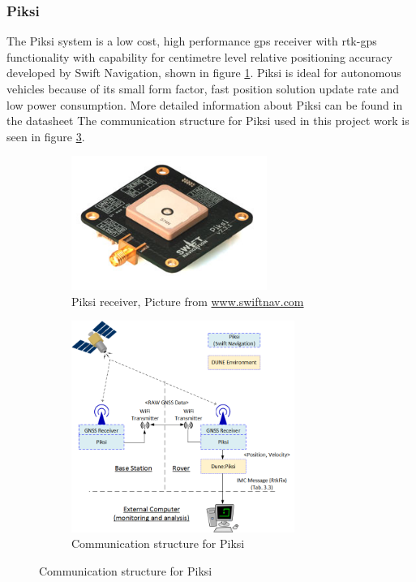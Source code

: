 \subsubsection{Piksi}\label{ss:Piksi}
The Piksi system is a low cost, high performance \gls{gps} receiver with \gls{rtk-gps} functionality with capability for centimetre level relative positioning accuracy developed by Swift Navigation, shown in figure \ref{figure:Piksi}. Piksi is ideal for autonomous vehicles because of its small form factor, fast position solution update rate and low power consumption. 
More detailed information about Piksi can be found in the datasheet \citep{Piksiv231}
The communication structure for Piksi used in this project work is seen in figure \ref{figure:CommunicationPiksi}.
\begin{figure}[H]
\begin{subfigure}[H]{1\textwidth}
	\centering
		\includegraphics[width=0.7\textwidth]{figs/piksi_top.jpg}
		\caption{Piksi receiver, Picture from \url{www.swiftnav.com}}
		\label{figure:Piksi}
\end{subfigure}

\begin{subfigure}[H]{1\textwidth}
	\centering
		\includegraphics[width=0.8\textwidth]{figs/Piksi.png}
		\caption{Communication structure for Piksi}
		\label{figure:CommunicationPiksi}
\end{subfigure}		
\end{figure}

